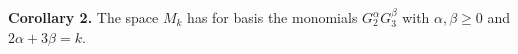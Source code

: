 \textbf{Corollary 2.} The space $M_k$ has for basis the monomials $G_2^\alpha G_3^\beta$ with $\alpha, \beta \geq 0$ and $2\alpha + 3\beta = k$.

